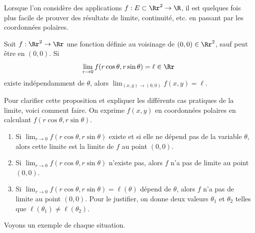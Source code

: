 \documentclass[12pt, class=report,crop=false]{standalone}
\begin{document}
Lorsque l'on considère des applications $f: E \subset \Rr^2 \rightarrow \R$, il est quelques fois plus facile de prouver des résultats de limite, continuité, etc. en passant par les coordonnées polaires.


\begin{proposition}
\label{prop:limrtheta}
Soit $f:\Rr^2\to \Rr$ une fonction définie au voisinage de $(0,0)\in \Rr^2$, sauf peut être en $(0,0)$. Si
$$\lim _{r\to 0}f(r\cos \theta ,r\sin \theta )=\ell \in \Rr$$
existe indépendamment de $\theta$, alors $\displaystyle \lim _{(x,y)\to (0,0)}f(x,y)=\ell$.
\end{proposition}


Pour clarifier cette proposition et expliquer les différents cas pratiques de la limite, voici comment faire. On exprime $f(x,y)$ en coordonnées polaires en calculant $f(r\cos\theta,r\sin\theta)$.
\begin{enumerate}
  \item Si $\lim_{r\to0} f(r\cos\theta,r\sin\theta)$ existe et si elle ne dépend pas de la variable $\theta$, alors cette limite est la limite de $f$ au point $(0,0)$.
  
  \item Si $\lim_{r\to0} f(r\cos\theta,r\sin\theta)$ n'existe pas, alors $f$ n'a pas de limite au  point $(0,0)$.
  
  \item Si $\lim_{r\to0} f(r\cos\theta,r\sin\theta) = \ell(\theta)$ dépend de $\theta$, alors $f$ n'a pas de limite au  point $(0,0)$. Pour le justifier, on donne deux valeurs $\theta_1$ et $\theta_2$ telles que $\ell(\theta_1) \neq \ell(\theta_2)$.
  
\end{enumerate}


Voyons un exemple de chaque situation.
\end{document}
